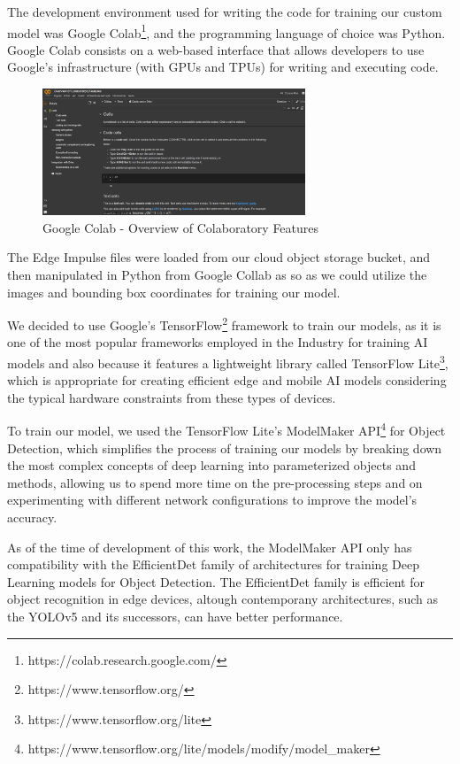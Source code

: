 \documentclass[openright]{normas-utf-tex} %
\begin{document}
The development environment used for writing the code for training our custom model
was Google Colab\footnote{https://colab.research.google.com/}, and the programming language 
of choice was Python. 
Google Colab consists on a web-based interface that allows developers
to use Google's infrastructure (with GPUs and TPUs) for writing and executing code.

\begin{figure}[H]
	\centering
	\includegraphics[width=0.7\textwidth]{./images/google-colab.png}
	\caption[Google Colab - Overview of Colaboratory Features]{Google Colab - Overview of Colaboratory Features}
    \label{fig:diff}
\end{figure}

The Edge Impulse files were loaded from our cloud object storage bucket, and then manipulated in Python
from Google Collab as so as we could utilize the images and bounding box coordinates for training
our model.

We decided to use Google's TensorFlow\footnote{https://www.tensorflow.org/} framework to train our 
models, as it is one of the most popular frameworks employed in the Industry for training AI models
and also because it features a lightweight library called TensorFlow Lite\footnote{https://www.tensorflow.org/lite}, 
which is appropriate for creating efficient edge and mobile AI models considering the 
typical hardware constraints from these types of devices.

To train our model, we used the TensorFlow Lite's ModelMaker API\footnote{https://www.tensorflow.org/lite/models/modify/model\_maker} 
for Object Detection, which simplifies the process of training our models by breaking down the most
complex concepts of deep learning into parameterized objects and methods, allowing us to spend
more time on the pre-processing steps and on experimenting with different network configurations
to improve the model's accuracy. 

As of the time of development of this work, the ModelMaker API only has compatibility with the 
EfficientDet family of architectures\cite{Mingxing2020}
for training Deep Learning models for Object Detection. 
The EfficientDet family is efficient for object recognition in edge devices, altough contemporany 
architectures, such as the YOLOv5 and its successors, can have better performance.
\end{document}
